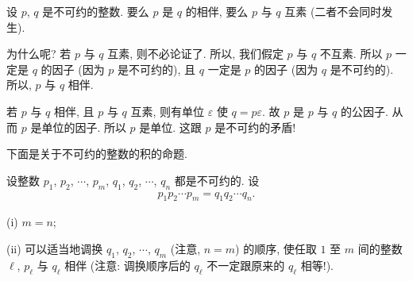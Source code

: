 \begin{remark}
    设 $p$, $q$ 是不可约的整数. 要么 $p$ 是 $q$ 的相伴, 要么 $p$ 与 $q$ 互素 (二者不会同时发生).

    为什么呢? 若 $p$ 与 $q$ 互素, 则不必论证了. 所以, 我们假定 $p$ 与 $q$ 不互素. 所以 $p$ 一定是 $q$ 的因子 (因为 $p$ 是不可约的), 且 $q$ 一定是 $p$ 的因子 (因为 $q$ 是不可约的). 所以, $p$ 与 $q$ 相伴.

    若 $p$ 与 $q$ 相伴, 且 $p$ 与 $q$ 互素, 则有单位 $\varepsilon$ 使 $q = p\varepsilon$. 故 $p$ 是 $p$ 与 $q$ 的公因子. 从而 $p$ 是单位的因子. 所以 $p$ 是单位. 这跟 $p$ 是不可约的矛盾!
\end{remark}

下面是关于不可约的整数的积的命题.

\begin{proposition}
    设整数 $p_1$, $p_2$, $\cdots$, $p_m$, $q_1$, $q_2$, $\cdots$, $q_n$ 都是不可约的. 设
    \begin{align*}
        p_1 p_2 \cdots p_m = q_1 q_2 \cdots q_n.
    \end{align*}

    (i) $m = n$;

    (ii) 可以适当地调换 $q_1$, $q_2$, $\cdots$, $q_m$ (注意, $n = m$) 的顺序, 使任取 $1$ 至 $m$ 间的整数 $\ell$, $p_{\ell}$ 与 $q_{\ell}$ 相伴 (注意: 调换顺序后的 $q_{\ell}$ 不一定跟原来的 $q_{\ell}$ 相等!).
\end{proposition}

